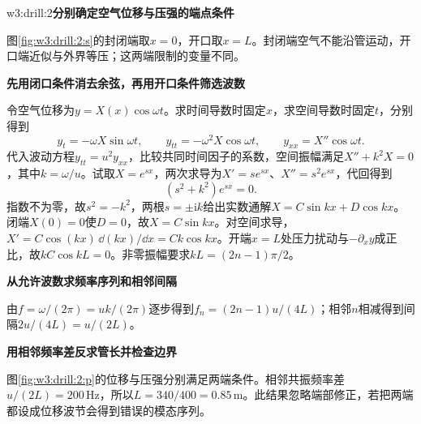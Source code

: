 \begin{drillsolution}{w3:drill:2}\textbf{分别确定空气位移与压强的端点条件}\par\nobreak
图\ref{fig:w3:drill:2:s}的封闭端取$x=0$，开口取$x=L$。封闭端空气不能沿管运动，开口端近似与外界等压；这两端限制的变量不同。


\par\medskip{}\noindent\textbf{先用闭口条件消去余弦，再用开口条件筛选波数}\par\nobreak
令空气位移为$y=X(x)\cos\omega t$。求时间导数时固定$x$，求空间导数时固定$t$，分别得到
\[
y_t=-\omega X\sin\omega t,\qquad
y_{tt}=-\omega^2X\cos\omega t,\qquad
y_{xx}=X''\cos\omega t.
\]
代入波动方程$y_{tt}=u^2y_{xx}$，比较共同时间因子的系数，空间振幅满足$X''+k^2X=0$，其中$k=\omega/u$。试取$X=e^{sx}$，两次求导为$X'=se^{sx}$、$X''=s^2e^{sx}$，代回得到
\[
(s^2+k^2)e^{sx}=0.
\]
指数不为零，故$s^2=-k^2$，两根$s=\pm\mathrm ik$给出实数通解$X=C\sin kx+D\cos kx$。闭端$X(0)=0$使$D=0$，故$X=C\sin kx$。对空间求导，$X'=C\cos(kx)\,\dd(kx)/\dd x=Ck\cos kx$。开端$x=L$处压力扰动与$-\partial_xy$成正比，故$kC\cos kL=0$。非零振幅要求$kL=(2n-1)\pi/2$。

\par\medskip{}\noindent\textbf{从允许波数求频率序列和相邻间隔}\par\nobreak
由$f=\omega/(2\pi)=uk/(2\pi)$逐步得到$f_n=(2n-1)u/(4L)$；相邻$n$相减得到间隔$2u/(4L)=u/(2L)$。



\par\medskip{}\noindent\textbf{用相邻频率差反求管长并检查边界}\par\nobreak
图\ref{fig:w3:drill:2:p}的位移与压强分别满足两端条件。相邻共振频率差$u/(2L)=200\,\mathrm{Hz}$，所以$L=340/400=0.85\,\mathrm m$。此结果忽略端部修正，若把两端都设成位移波节会得到错误的模态序列。\end{drillsolution}
